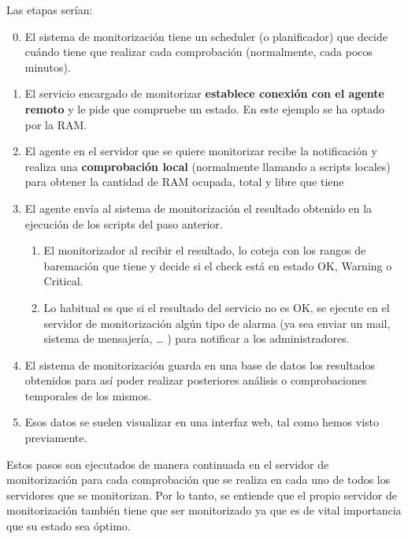 Las etapas serían:
\begin{enumerate}
    \setcounter{enumi}{-1}
    \item El sistema de monitorización tiene un scheduler (o planificador) que decide cuándo tiene que realizar cada comprobación (normalmente, cada pocos minutos).
    \item El servicio encargado de monitorizar \textbf{establece conexión con el agente remoto} y le pide que compruebe un estado. En este ejemplo se ha optado por la RAM.
    \item El agente en el servidor que se quiere monitorizar recibe la notificación y realiza una \textbf{comprobación local} (normalmente llamando a scripts locales) para obtener la cantidad de RAM ocupada, total y libre que tiene
    \item El agente envía al sistema de monitorización el resultado obtenido en la ejecución de los scripts del paso anterior.
    \begin{enumerate}
        \item El monitorizador al recibir el resultado, lo coteja con los rangos de baremación que tiene y decide si el check está en estado OK, Warning o Critical.
        \item Lo habitual es que si el resultado del servicio no es OK, se ejecute en el servidor de monitorización algún tipo de alarma (ya sea enviar un mail, sistema de mensajería, … ) para notificar a los administradores.
    \end{enumerate}
    \item El sistema de monitorización guarda en una base de datos los resultados obtenidos para así poder realizar posteriores análisis o comprobaciones temporales de los mismos.
    \item Esos datos se suelen visualizar en una interfaz web, tal como hemos visto previamente.
\end{enumerate}

Estos pasos son ejecutados de manera continuada en el servidor de monitorización para cada comprobación que se realiza en cada uno de todos los servidores que se monitorizan. Por lo tanto, se entiende que el propio servidor de monitorización también tiene que ser monitorizado ya que es de vital importancia que su estado sea óptimo.

